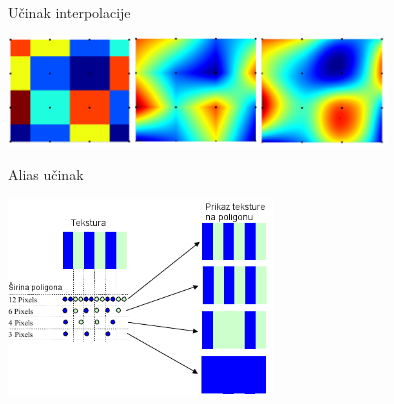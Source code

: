 \documentclass[9pt]{beamer}
\begin{document}
%
%
\begin{frame}{Učinak interpolacije}
	\begin{center}
		\includegraphics[width=10cm]{slike/teksture_magnification_01.png}
	\end{center}
\end{frame}
%
%
\begin{frame}{Alias učinak}
	
	\begin{center}
		\includegraphics[width=7cm]{slike/04_alias_tekstura.png}
	\end{center}
\end{frame}
\end{document}
